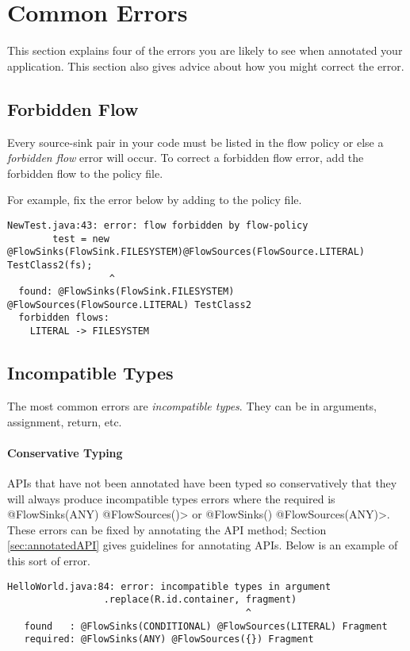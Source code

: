 \section{Common Errors\label{errors}}

This section explains four of the errors you are likely to see when annotated your application.  This section also gives advice about how you might correct the error.   

\subsection{Forbidden Flow}  
Every source-sink pair in your code must be listed in the flow policy or else a \emph{forbidden flow} error will occur.
To correct a forbidden flow error, add the forbidden flow to the policy file. 
  
For example, fix the error below by adding  to the policy file.
\begin{Verbatim}
NewTest.java:43: error: flow forbidden by flow-policy  
        test = new @FlowSinks(FlowSink.FILESYSTEM)@FlowSources(FlowSource.LITERAL) TestClass2(fs);
                  ^
  found: @FlowSinks(FlowSink.FILESYSTEM) @FlowSources(FlowSource.LITERAL) TestClass2 
  forbidden flows:
    LITERAL -> FILESYSTEM
\end{Verbatim}

\subsection{Incompatible Types}
The most common errors are \emph{incompatible types}.  They can be in arguments,  assignment, return, etc.

\paragraph{Conservative Typing}

APIs that have not been annotated have been typed so conservatively that they will always produce incompatible types errors where the required is \<@FlowSinks(ANY) @FlowSources({})> or 
\<@FlowSinks({}) @FlowSources(ANY)>.  These errors can be fixed by annotating the API method; 
Section \ref{sec:annotatedAPI} gives guidelines for annotating APIs. 
Below is an example of this sort of error.

\begin{Verbatim}
HelloWorld.java:84: error: incompatible types in argument
                 .replace(R.id.container, fragment)
                                          ^
   found   : @FlowSinks(CONDITIONAL) @FlowSources(LITERAL) Fragment
   required: @FlowSinks(ANY) @FlowSources({}) Fragment
\end{Verbatim}

